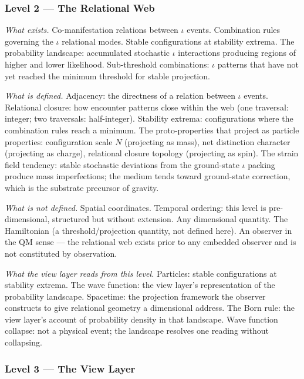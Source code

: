 \documentclass[11pt,letterpaper]{article}
\begin{document}
\subsubsection{Level 2 --- The Relational Web}
\label{sec:org104bc15}

\emph{What exists.} Co-manifestation relations between \(\iota\) events. Combination rules governing the \(\iota\) relational modes. Stable configurations at stability extrema. The probability landscape: accumulated stochastic \(\iota\) interactions producing regions of higher and lower likelihood. Sub-threshold combinations: \(\iota\) patterns that have not yet reached the minimum threshold for stable projection.

\emph{What is defined.} Adjacency: the directness of a relation between \(\iota\) events. Relational closure: how encounter patterns close within the web (one traversal: integer; two traversals: half-integer). Stability extrema: configurations where the combination rules reach a minimum. The proto-properties that project as particle properties: configuration scale \(N\) (projecting as mass), net distinction character (projecting as charge), relational closure topology (projecting as spin). The strain field tendency: stable stochastic deviations from the ground-state \(\iota\) packing produce mass imperfections; the medium tends toward ground-state correction, which is the substrate precursor of gravity.

\emph{What is not defined.} Spatial coordinates. Temporal ordering: this level is pre-dimensional, structured but without extension. Any dimensional quantity. The Hamiltonian (a threshold/projection quantity, not defined here). An observer in the QM sense --- the relational web exists prior to any embedded observer and is not constituted by observation.

\emph{What the view layer reads from this level.} Particles: stable configurations at stability extrema. The wave function: the view layer's representation of the probability landscape. Spacetime: the projection framework the observer constructs to give relational geometry a dimensional address. The Born rule: the view layer's account of probability density in that landscape. Wave function collapse: not a physical event; the landscape resolves one reading without collapsing.

\subsubsection{Level 3 --- The View Layer}
\label{sec:org77a3c69}
\end{document}
